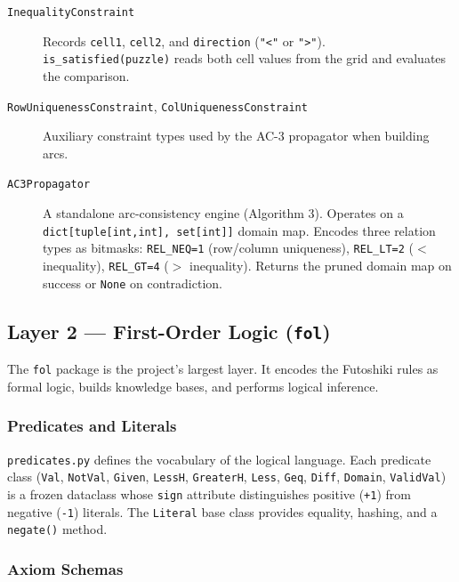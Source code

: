 \begin{description}
  \item[\texttt{InequalityConstraint}] Records \texttt{cell1}, \texttt{cell2},
    and \texttt{direction} (\texttt{"<"} or \texttt{">"}).
    \texttt{is\_satisfied(puzzle)} reads both cell values from the grid and
    evaluates the comparison.

  \item[\texttt{RowUniquenessConstraint}, \texttt{ColUniquenessConstraint}]
    Auxiliary constraint types used by the AC-3 propagator when building arcs.

  \item[\texttt{AC3Propagator}] A standalone arc-consistency engine (Algorithm 3).
    Operates on a \texttt{dict[tuple[int,int], set[int]]} domain map.
    Encodes three relation types as bitmasks:
    \texttt{REL\_NEQ=1} (row/column uniqueness),
    \texttt{REL\_LT=2} ($<$ inequality),
    \texttt{REL\_GT=4} ($>$ inequality).
    Returns the pruned domain map on success or \texttt{None} on contradiction.
\end{description}

\subsection{Layer 2 — First-Order Logic (\texttt{fol})}
\label{sec:layer_fol}

The \texttt{fol} package is the project's largest layer.
It encodes the Futoshiki rules as formal logic, builds knowledge bases, and
performs logical inference.

\subsubsection{Predicates and Literals}

\texttt{predicates.py} defines the vocabulary of the logical language.
Each predicate class (\texttt{Val}, \texttt{NotVal}, \texttt{Given},
\texttt{LessH}, \texttt{GreaterH}, \texttt{Less}, \texttt{Geq}, \texttt{Diff},
\texttt{Domain}, \texttt{ValidVal}) is a frozen dataclass whose
\texttt{sign} attribute distinguishes positive (\texttt{+1}) from negative
(\texttt{-1}) literals.
The \texttt{Literal} base class provides equality, hashing, and a
\texttt{negate()} method.

\subsubsection{Axiom Schemas}

